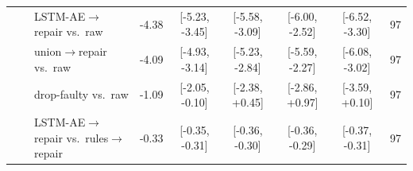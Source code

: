 \begin{longtable}{lllcccccc}
 &  & LSTM-AE$\rightarrow$repair vs.\ raw & -4.38 & [-5.23, -3.45] & [-5.58, -3.09] & [-6.00, -2.52] & [-6.52, -3.30] & 97 \\
 &  & union$\rightarrow$repair vs.\ raw & -4.09 & [-4.93, -3.14] & [-5.23, -2.84] & [-5.59, -2.27] & [-6.08, -3.02] & 97 \\
 &  & drop-faulty vs.\ raw & -1.09 & [-2.05, -0.10] & [-2.38, +0.45] & [-2.86, +0.97] & [-3.59, +0.10] & 97 \\
 &  & LSTM-AE$\rightarrow$repair vs.\ rules$\rightarrow$repair & -0.33 & [-0.35, -0.31] & [-0.36, -0.30] & [-0.36, -0.29] & [-0.37, -0.31] & 97 \\
\end{longtable}
